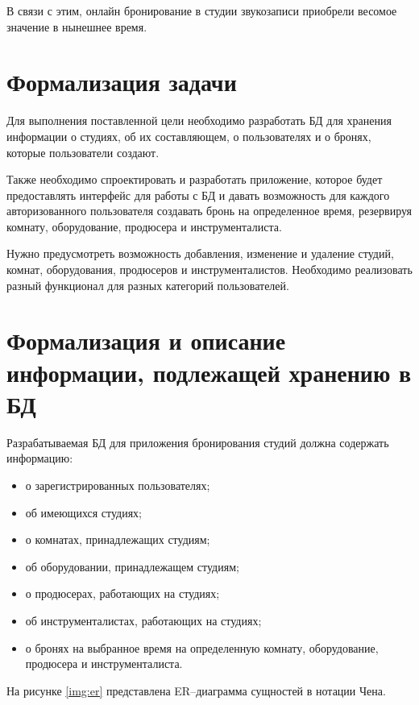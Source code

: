 В связи с этим, онлайн бронирование в студии звукозаписи приобрели весомое значение в нынешнее время.

\section{Формализация задачи}
Для выполнения поставленной цели необходимо разработать БД для хранения информации о студиях, об их составляющем, о пользователях и о бронях, которые пользователи создают.

Также необходимо спроектировать и разработать приложение, которое будет предоставлять интерфейс для работы с БД и давать возможность для каждого авторизованного пользователя создавать бронь на определенное время, резервируя комнату, оборудование, продюсера и инструменталиста.

Нужно предусмотреть возможность добавления, изменение и удаление студий, комнат, оборудования, продюсеров и инструменталистов.
Необходимо реализовать разный функционал для разных категорий пользователей.

\section{Формализация и описание информации, подлежащей хранению в БД}
Разрабатываемая БД для приложения бронирования студий должна содержать информацию:
\begin{itemize}
	\item о зарегистрированных пользователях;
	\item об имеющихся студиях;
	\item о комнатах, принадлежащих студиям;
	\item об оборудовании, принадлежащем студиям;
	\item о продюсерах, работающих на студиях;
	\item об инструменталистах, работающих на студиях;
	\item о бронях на выбранное время на определенную комнату, оборудование, продюсера и инструменталиста.
\end{itemize}

На рисунке \ref{img:er} представлена ER--диаграмма сущностей в нотации Чена.

